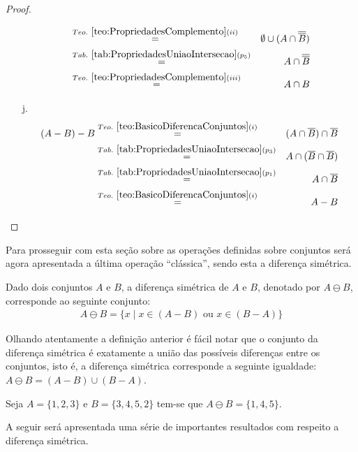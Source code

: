 \begin{proof}
\begin{itemize}
\begin{eqnarray*}
			& \stackrel{Teo. \ \ref{teo:PropriedadesComplemento}(ii)}{=}& \emptyset  \cup (A \cap \overline{\overline{B}})\\
			& \stackrel{Tab. \ \ref{tab:PropriedadesUniaoIntersecao}(p_5)}{=}& A \cap \overline{\overline{B}}\\
			& \stackrel{Teo. \ \ref{teo:PropriedadesComplemento}(iii)}{=}& A \cap B
		\end{eqnarray*}
		\item[j.]
		\begin{eqnarray*}
			(A - B) - B & \stackrel{Teo. \  \ref{teo:BasicoDiferencaConjuntos}(i)}{=} & (A \cap \overline{B}) \cap \overline{B}\\
			& \stackrel{Tab. \ \ref{tab:PropriedadesUniaoIntersecao}(p_3)}{=}& A \cap (\overline{B} \cap \overline{B})\\
			& \stackrel{Tab. \ \ref{tab:PropriedadesUniaoIntersecao}(p_1)}{=}& A \cap \overline{B}\\
			& \stackrel{Teo. \  \ref{teo:BasicoDiferencaConjuntos}(i)}{=} & A - B
		\end{eqnarray*}
	\end{itemize}
\end{proof}

Para prosseguir com esta seção sobre as operações definidas sobre conjuntos será agora apresentada a última operação ``clássica'', sendo esta a diferença simétrica.

\begin{definicao}\label{def:DiferencaSimetricaConjuntos}
	Dado dois conjuntos $A$ e $B$, a diferença simétrica de $A$ e $B$, denotado por $A \ominus B$, corresponde ao seguinte conjunto:
  \begin{eqnarray*}
    A \ominus B = \{x \mid x \in (A - B) \mbox{ ou } x \in (B - A)\}
  \end{eqnarray*}
\end{definicao}

Olhando atentamente a definição anterior é fácil notar que o conjunto da diferença simétrica é exatamente a união das possíveis diferenças entre os conjuntos, isto é, a diferença simétrica corresponde a seguinte igualdade: $A \ominus B = (A - B) \cup (B - A)$.

\begin{exemplo}\label{exe:DiferencaSimetricaConjuntos1}
  Seja $A = \{1, 2, 3\}$ e $B = \{3, 4, 5, 2\}$ tem-se que $A \ominus B = \{1, 4, 5\}$.
\end{exemplo}

A seguir será apresentada uma série de importantes resultados com respeito a diferença simétrica.

